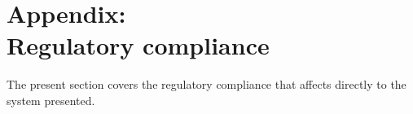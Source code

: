 
\section {Appendix: \\Regulatory compliance}

The present section covers the regulatory compliance that affects directly to the system presented. 






	
